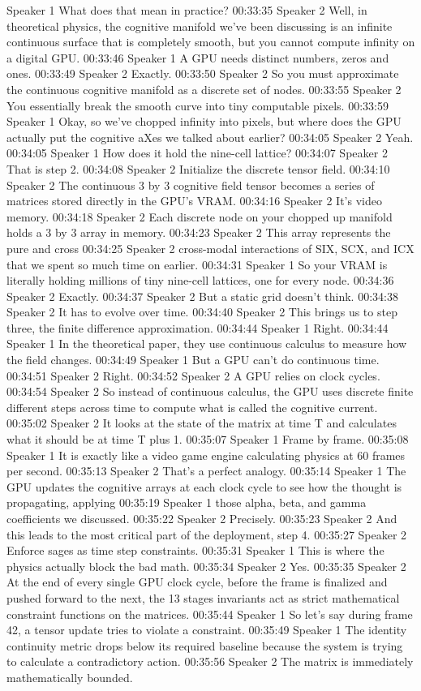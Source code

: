 Speaker 1 What does that mean in practice? 00:33:35 Speaker 2 Well, in theoretical physics, the cognitive manifold we've been discussing is an infinite continuous surface that is completely smooth, but you cannot compute infinity on a digital GPU. 00:33:46 Speaker 1 A GPU needs distinct numbers, zeros and ones. 00:33:49 Speaker 2 Exactly. 00:33:50 Speaker 2 So you must approximate the continuous cognitive manifold as a discrete set of nodes. 00:33:55 Speaker 2 You essentially break the smooth curve into tiny computable pixels. 00:33:59 Speaker 1 Okay, so we've chopped infinity into pixels, but where does the GPU actually put the cognitive aXes we talked about earlier? 00:34:05 Speaker 2 Yeah. 00:34:05 Speaker 1 How does it hold the nine-cell lattice? 00:34:07 Speaker 2 That is step 2. 00:34:08 Speaker 2 Initialize the discrete tensor field. 00:34:10 Speaker 2 The continuous 3 by 3 cognitive field tensor becomes a series of matrices stored directly in the GPU's VRAM. 00:34:16 Speaker 2 It's video memory. 00:34:18 Speaker 2 Each discrete node on your chopped up manifold holds a 3 by 3 array in memory. 00:34:23 Speaker 2 This array represents the pure and cross 00:34:25 Speaker 2 cross-modal interactions of SIX, SCX, and ICX that we spent so much time on earlier. 00:34:31 Speaker 1 So your VRAM is literally holding millions of tiny nine-cell lattices, one for every node. 00:34:36 Speaker 2 Exactly. 00:34:37 Speaker 2 But a static grid doesn't think. 00:34:38 Speaker 2 It has to evolve over time. 00:34:40 Speaker 2 This brings us to step three, the finite difference approximation. 00:34:44 Speaker 1 Right. 00:34:44 Speaker 1 In the theoretical paper, they use continuous calculus to measure how the field changes. 00:34:49 Speaker 1 But a GPU can't do continuous time. 00:34:51 Speaker 2 Right. 00:34:52 Speaker 2 A GPU relies on clock cycles. 00:34:54 Speaker 2 So instead of continuous calculus, the GPU uses discrete finite different steps across time to compute what is called the cognitive current. 00:35:02 Speaker 2 It looks at the state of the matrix at time T and calculates what it should be at time T plus 1. 00:35:07 Speaker 1 Frame by frame. 00:35:08 Speaker 1 It is exactly like a video game engine calculating physics at 60 frames per second. 00:35:13 Speaker 2 That's a perfect analogy. 00:35:14 Speaker 1 The GPU updates the cognitive arrays at each clock cycle to see how the thought is propagating, applying 00:35:19 Speaker 1 those alpha, beta, and gamma coefficients we discussed. 00:35:22 Speaker 2 Precisely. 00:35:23 Speaker 2 And this leads to the most critical part of the deployment, step 4. 00:35:27 Speaker 2 Enforce sages as time step constraints. 00:35:31 Speaker 1 This is where the physics actually block the bad math. 00:35:34 Speaker 2 Yes. 00:35:35 Speaker 2 At the end of every single GPU clock cycle, before the frame is finalized and pushed forward to the next, the 13 stages invariants act as strict mathematical constraint functions on the matrices. 00:35:44 Speaker 1 So let's say during frame 42, a tensor update tries to violate a constraint. 00:35:49 Speaker 1 The identity continuity metric drops below its required baseline because the system is trying to calculate a contradictory action. 00:35:56 Speaker 2 The matrix is immediately mathematically bounded. 